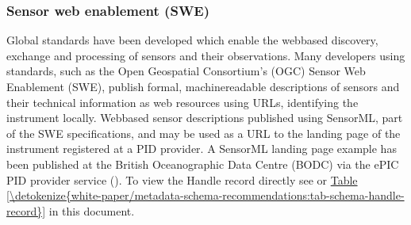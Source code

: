 \documentclass[a4paper,10pt,english]{sphinxmanual}
\begin{document}
\subsubsection{Sensor web enablement (SWE)}
\label{\detokenize{white-paper/landing-page-encoding:sensor-web-enablement-swe}}\label{\detokenize{white-paper/landing-page-encoding:landing-page-encoding-swe}}
\sphinxAtStartPar
Global standards have been developed which enable the web\sphinxhyphen{}based
discovery, exchange and processing of sensors and their observations.
Many developers using standards, such as the Open Geospatial
Consortium’s (OGC) Sensor Web Enablement (SWE), publish formal,
machine\sphinxhyphen{}readable descriptions of sensors and their technical information
as web resources using URLs, identifying the instrument locally.
Web\sphinxhyphen{}based sensor descriptions published using SensorML, part of the SWE
specifications, and may be used as a URL to the landing page of the
instrument registered at a PID provider. A SensorML landing page example
has been published at the British Oceanographic Data Centre (BODC) via
the ePIC PID provider service
(). To view the Handle
record directly see
 or
\hyperref[\detokenize{white-paper/metadata-schema-recommendations:tab-schema-handle-record}]{Table \ref{\detokenize{white-paper/metadata-schema-recommendations:tab-schema-handle-record}}} in this document.
\end{document}
